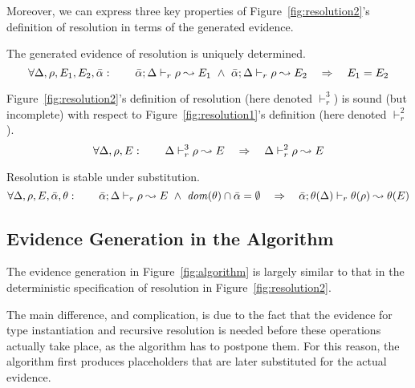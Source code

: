 Moreover, we can express three key properties of Figure~\ref{fig:resolution2}'s
definition of resolution in terms of the generated evidence.
\begin{lemma}[Determinacy]
The generated evidence of resolution is uniquely determined.
\[\forall \Delta, \rho, E_1, E_2, \bar{\alpha}: \quad\quad \bar{\alpha};\Delta \vdash_r \rho \leadsto E_1 ~\wedge~ \bar{\alpha};\Delta \vdash_r \rho \leadsto E_2 \quad\Rightarrow\quad E_1 = E_2 \]
\end{lemma}
\begin{lemma}[Soundness]
Figure~\ref{fig:resolution2}'s definition of resolution (here denoted $\vdash_r^3$)
is sound (but incomplete) with respect to Figure~\ref{fig:resolution1}'s definition
(here denoted $\vdash_r^2$).
\[\forall \Delta, \rho, E: \quad\quad \Delta \vdash_r^3 \rho \leadsto E \quad\Rightarrow\quad \Delta \vdash_r^2 \rho \leadsto E \]
\end{lemma}
\begin{lemma}[Coherence]
Resolution is stable under substitution.
\[\forall \Delta, \rho, E, \bar{\alpha}, \theta: \quad\quad \bar{\alpha};\Delta \vdash_r \rho \leadsto E ~\wedge~ \mathit{dom}(\theta) \cap \bar{\alpha} = \emptyset \quad\Rightarrow\quad \bar{\alpha};\theta(\Delta) \vdash_r \theta(\rho) \leadsto \theta(E) \]
\end{lemma}

\subsection{Evidence Generation in the Algorithm}

The evidence generation in Figure~\ref{fig:algorithm} is largely similar to
that in the deterministic specification of resolution in
Figure~\ref{fig:resolution2}.

The main difference, and complication, is due to the fact that the evidence for
type instantiation and recursive resolution is needed before these operations
actually take place, as the algorithm has to postpone them. For this reason, the
algorithm first produces placeholders that are later substituted for the actual
evidence.

